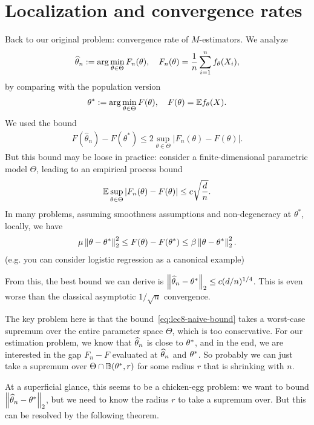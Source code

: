 \documentclass[11pt,letterpaper]{article}
\numberwithin{theorem}{lecture}
\numberwithin{proposition}{lecture}
\numberwithin{lemma}{lecture}
\numberwithin{claim}{lecture}
\numberwithin{corollary}{lecture}
\numberwithin{definition}{lecture}
\numberwithin{conjecture}{lecture}
\numberwithin{remark}{lecture}
\numberwithin{example}{lecture}
\numberwithin{equation}{lecture}
\begin{document}
\section{Localization and convergence rates}
Back to our original problem: convergence rate of $M$-estimators. We analyze
\begin{align*}
  \widehat{\theta}_n := \arg\min_{\theta \in \Theta} F_n (\theta), \quad F_n (\theta) = \frac{1}{n} \sum_{i = 1}^n f_\theta (X_i),
\end{align*}
by comparing with the population version
\begin{align*}
  \theta^* := \arg\min_{\theta \in \Theta} F(\theta), \quad F(\theta) = {\mathbb{E}} f_\theta ( X).
\end{align*}
We used the bound
\begin{align}
  F (\widehat{\theta}_n) - F(\theta^*) \leq 2 \sup_{\theta \in \Theta} |F_n (\theta) - F(\theta)|.\label{eq:lec8-naive-bound}
\end{align}
But this bound may be loose in practice: consider a finite-dimensional parametric model $\Theta$, leading to an empirical process bound
\begin{align*}
   {\mathbb{E}} \sup_{\theta \in \Theta} |F_n (\theta) - F(\theta)| \leq c \sqrt{\frac{d}{n}}.
\end{align*}
In many problems, assuming smoothness assumptions and non-degeneracy at $\theta^*$, locally, we have
\begin{align*}
  \mu \left\| \theta - {\theta^*}\right\|_{2}^2 \leq F (\theta) - F (\theta^*) \leq \beta \left\| \theta - {\theta^*}\right\|_{2}^2.
\end{align*}
(e.g. you can consider logistic regression as a canonical example)

From this, the best bound we can derive is $\left\| \widehat{\theta}_n - {\theta^*}\right\|_{2} \leq c (d/n)^{1/4}$. This is even worse than the classical asymptotic $1/\sqrt{n}$ convergence.

The key problem here is that the bound~\eqref{eq:lec8-naive-bound} takes a worst-case supremum over the entire parameter space $\Theta$, which is too conservative. For our estimation problem, we know that $\widehat{\theta}_n$ is close to ${\theta^*}$, and in the end, we are interested in the gap $F_n - F$ evaluated at $\widehat{\theta}_n$ and ${\theta^*}$. So probably we can just take a supremum over $\Theta \cap \mathbb{B} ({\theta^*}, r)$ for some radius $r$ that is shrinking with $n$.

At a superficial glance, this seems to be a chicken-egg problem: we want to bound $\left\| \widehat{\theta}_n - {\theta^*}\right\|_{2}$, but we need to know the radius $r$ to take a supremum over. But this can be resolved by the following theorem.
\end{document}
